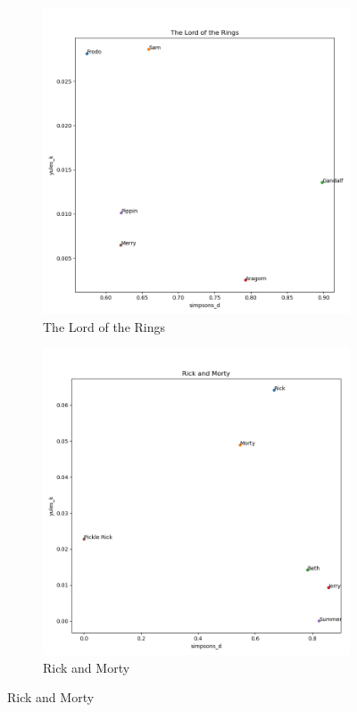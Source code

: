 \documentclass{article}
\begin{document}
\begin{titlepage}
\begin{figure}[H]
    \centering
    \caption{Selected Within-Media Plots}
    \begin{subfigure}[b]{0.45\textwidth}
        \centering
        \includegraphics[width=\textwidth]{images/The Lord of the Rings_heuristics.png}
        \caption{The Lord of the Rings}
        \label{fig:subfig1}
    \end{subfigure}
    \hfill
    \begin{subfigure}[b]{0.45\textwidth}
        \centering
        \includegraphics[width=\textwidth]{images/Rick and Morty_heuristics.png}
        \caption{Rick and Morty}
        \label{fig:subfig2}
    \end{subfigure}
    \label{fig:main}
\end{figure} 


\end{titlepage}
\end{document}
